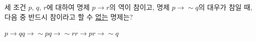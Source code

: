 세 조건 $p$, $q$, $r$에 대하여 명제 $p\longrightarrow r$의 역이 참이고, 명제 $p\longrightarrow\sim q$의 대우가 참일 때, 다음 중 반드시 참이라고 할 수 \underline{없는} 명제는?
\begin{choices32}{$p\longrightarrow q$}{$q\longrightarrow\sim p$}{$q\longrightarrow\sim r$}{$r\longrightarrow p$}{$r\longrightarrow\sim q$}\end{choices32}
